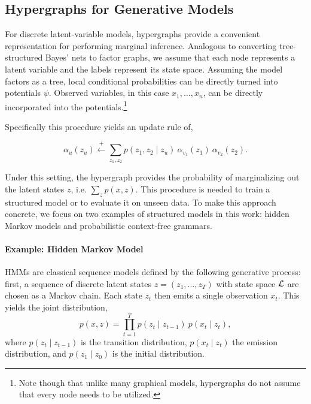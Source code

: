 \documentclass{article}
\begin{document}
\subsection{Hypergraphs for Generative Models}

For discrete latent-variable models, hypergraphs provide a convenient
representation for performing marginal inference.  Analogous to converting
tree-structured Bayes' nets to factor graphs, we assume that each node
represents a latent variable and the labels represent its state space.
Assuming the model factors as a tree, local conditional probabilities
can be directly turned into potentials $\psi$. Observed variables, in
this case $x_1, \ldots, x_n$, can be directly incorporated into the
potentials.\footnote{Note though that unlike many graphical models,
hypergraphs do not assume that every node needs to be utilized.}



Specifically this procedure yields an update rule of,

\[\alpha_u(z_u) \stackrel{+}{\gets} \displaystyle \sum_{z_1, z_2}  p(z_1, z_2 \mid z_u) \  \alpha_{v_1}(z_1) \  \alpha_{v_2}(z_2).\]

Under this setting, the hypergraph provides the probability of
marginalizing out the latent states $z$, i.e. $\sum_z p(x, z)$. This procedure is needed to train a structured model or to evaluate
it on unseen data. To make this approach concrete, we focus on two examples of structured
models in this work: hidden Markov models and probabilistic
context-free grammars.


\paragraph{Example: Hidden Markov Model}

HMMs are classical sequence models defined by the following generative process: first, a sequence of discrete latent states $z = (z_1, \ldots,z_T)$ with state space $\cal L$ are chosen as a Markov chain. Each state $z_t$ then emits a single observation $x_t$.
This yields the joint distribution,
\begin{equation}
\label{eqn:hmm}
    p(x,z) = \prod_{t=1}^T p(z_t \mid z_{t-1})\ p(x_t\mid z_t),
\end{equation}
where $p(z_t \mid z_{t-1})$ is the transition distribution,
 $p(x_t \mid z_t)$ the emission distribution, and $p(z_1 \mid z_0)$ is 
the initial distribution.
\end{document}
